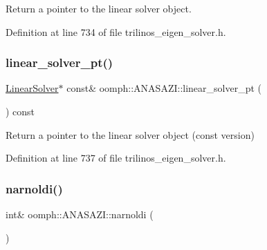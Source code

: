 Return a pointer to the linear solver object. 



Definition at line 734 of file trilinos\+\_\+eigen\+\_\+solver.\+h.

\mbox{\label{classoomph_1_1ANASAZI_a8abde7ddc8a5785c9db713c45ed61e24}} 
\subsubsection{\texorpdfstring{linear\+\_\+solver\+\_\+pt()}{linear\_solver\_pt()}\hspace{0.1cm}{\footnotesize\ttfamily [2/2]}}
{\footnotesize\ttfamily \hyperlink{classoomph_1_1LinearSolver}{Linear\+Solver}$\ast$ const\& oomph\+::\+A\+N\+A\+S\+A\+Z\+I\+::linear\+\_\+solver\+\_\+pt (\begin{DoxyParamCaption}{ }\end{DoxyParamCaption}) const\hspace{0.3cm}{\ttfamily [inline]}}



Return a pointer to the linear solver object (const version) 



Definition at line 737 of file trilinos\+\_\+eigen\+\_\+solver.\+h.

\mbox{\label{classoomph_1_1ANASAZI_a525fd6b30a06a869c50983d6ccad0801}} 
\subsubsection{\texorpdfstring{narnoldi()}{narnoldi()}\hspace{0.1cm}{\footnotesize\ttfamily [1/2]}}
{\footnotesize\ttfamily int\& oomph\+::\+A\+N\+A\+S\+A\+Z\+I\+::narnoldi (\begin{DoxyParamCaption}{ }\end{DoxyParamCaption})\hspace{0.3cm}{\ttfamily [inline]}}



